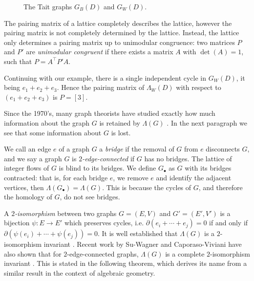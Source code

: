 \documentclass[12pt]{report}
\theoremstyle{upright}
\begin{document}
\begin{figure}[hbt]
	\centering
	\def\svgscale{0.4}
	
	\caption{The Tait graphs $G_{B}(D)$ and $G_{W}(D)$.}
	\label{fig:trefoil-abstract-tait}
\end{figure}

The pairing matrix of a lattice completely describes the lattice, however the pairing matrix is not completely determined by the lattice. Instead, the lattice only determines a pairing matrix up to unimodular congruence: two matrices $P$ and $P'$ are \textit{unimodular congruent} if there exists a matrix $A$ with $\det(A) = 1$, such that $P = A^{\top}P'A$.


Continuing with our example, there is a single independent cycle in $G_{W}(D)$, it being $e_{1} + e_{2} + e_{3}$. Hence the pairing matrix of $\Lambda_{W}(D)$ with respect to $( e_{1} + e_{2} + e_{3})$ is $P = [3]$.

Since the 1970's, many graph theorists have studied exactly how much information about the graph $G$ is retained by $\Lambda(G)$ \parencite{lattice-of-flows-cuts, torelli-for-graphs-tropical-curves, lattice-of-flows-regular-matroid}. In the next paragraph we see that some information about $G$ is lost.

We call an edge $e$ of a graph $G$ a \textit{bridge} if the removal of $G$ from $e$ disconnects $G$, and we say a graph $G$ is \textit{$2$-edge-connected} if $G$ has no bridges. The lattice of integer flows of $G$ is blind to its bridges. We define $G_{\bullet}$ as $G$ with its bridges contracted: that is, for each bridge $e$, we remove $e$ and identify the adjacent vertices, then $\Lambda(G_{\bullet}) = \Lambda(G)$. This is because the cycles of $G$, and therefore the homology of $G$, do not see bridges.

A \textit{$2$-isomorphism} between two graphs $G = (E, V)$ and $G' = (E', V')$ is a bijection \({\psi: E \longrightarrow E'}\) which preserves cycles, i.e. $\partial(e_{i} + \cdots + e_{j}) = 0$ if and only if $\partial\left(\psi(e_{i}) + \cdots + \psi(e_{j})\right) = 0$. It is well established that $\Lambda(G)$ is a $2$-isomorphism invariant \parencite{lattice-of-flows-cuts}. Recent work by Su-Wagner and Caporaso-Viviani have also shown that for $2$-edge-connected graphs, $\Lambda(G)$ is a complete $2$-isomorphism invariant \cites[Theorem 3.1.1]{torelli-for-graphs-tropical-curves}[Theorem 1]{lattice-of-flows-regular-matroid}. This is stated in the following theorem, which derives its name from a similar result in the context of algebraic geometry.
\end{document}
